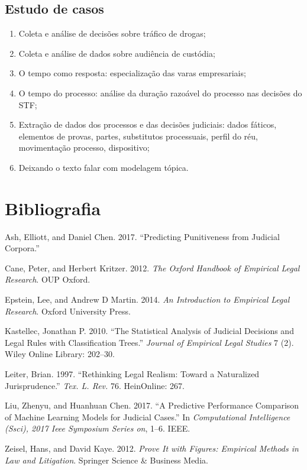 \documentclass[12pt]{article}
\providecommand{\tightlist}{%
  \setlength{\itemsep}{0pt}\setlength{\parskip}{0pt}}
\begin{document}
\subsection{Estudo de casos}\label{estudo-de-casos}

\begin{enumerate}
\def\labelenumi{\arabic{enumi}.}
\tightlist
\item
  Coleta e análise de decisões sobre tráfico de drogas;
\item
  Coleta e análise de dados sobre audiência de custódia;
\item
  O tempo como resposta: especialização das varas empresariais;
\item
  O tempo do processo: análise da duração razoável do processo nas
  decisões do STF;
\item
  Extração de dados dos processos e das decisões judiciais: dados
  fáticos, elementos de provas, partes, substitutos processuais, perfil
  do réu, movimentação processo, dispositivo;
\item
  Deixando o texto falar com modelagem tópica.
\end{enumerate}

\section*{Bibliografia}\label{bibliografia}

\hypertarget{refs}{}
\hypertarget{ref-ash2017}{}
Ash, Elliott, and Daniel Chen. 2017. ``Predicting Punitiveness from
Judicial Corpora.''

\hypertarget{ref-oxford2012}{}
Cane, Peter, and Herbert Kritzer. 2012. \emph{The Oxford Handbook of
Empirical Legal Research}. OUP Oxford.

\hypertarget{ref-epstein2014}{}
Epstein, Lee, and Andrew D Martin. 2014. \emph{An Introduction to
Empirical Legal Research}. Oxford University Press.

\hypertarget{ref-kastellec2010}{}
Kastellec, Jonathan P. 2010. ``The Statistical Analysis of Judicial
Decisions and Legal Rules with Classification Trees.'' \emph{Journal of
Empirical Legal Studies} 7 (2). Wiley Online Library: 202--30.

\hypertarget{ref-leiter1997}{}
Leiter, Brian. 1997. ``Rethinking Legal Realism: Toward a Naturalized
Jurisprudence.'' \emph{Tex. L. Rev.} 76. HeinOnline: 267.

\hypertarget{ref-liu2017}{}
Liu, Zhenyu, and Huanhuan Chen. 2017. ``A Predictive Performance
Comparison of Machine Learning Models for Judicial Cases.'' In
\emph{Computational Intelligence (Ssci), 2017 Ieee Symposium Series on},
1--6. IEEE.

\hypertarget{ref-zeisel2012}{}
Zeisel, Hans, and David Kaye. 2012. \emph{Prove It with Figures:
Empirical Methods in Law and Litigation}. Springer Science \& Business
Media.
\end{document}
